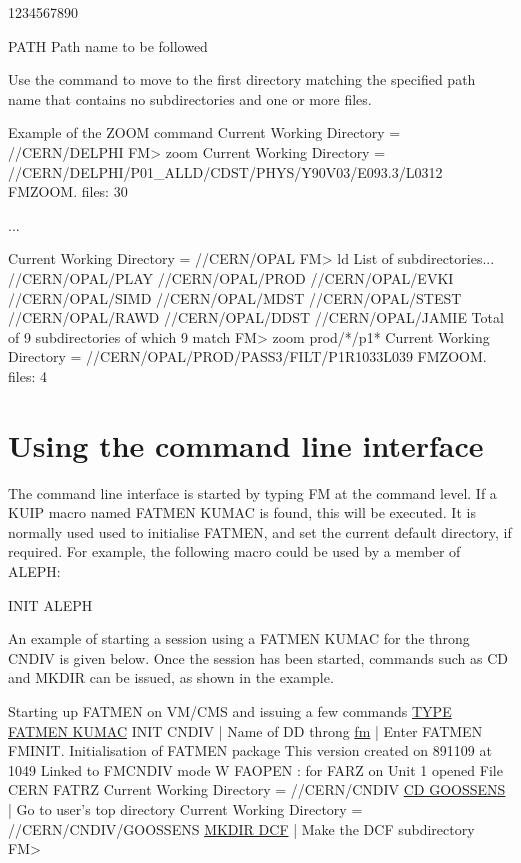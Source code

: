 \begin{DLtt}{1234567890}
\item[PATH]Path name to be followed
\end{DLtt}
Use the  command to move to the first directory matching
the specified path name that contains no subdirectories and
one or more files.
\begin{XMPt}{Example of the ZOOM command}
Current Working Directory = //CERN/DELPHI
FM> zoom
Current Working Directory = //CERN/DELPHI/P01_ALLD/CDST/PHYS/Y90V03/E093.3/L0312
FMZOOM. files:          30

...

Current Working Directory = //CERN/OPAL
FM> ld
List of subdirectories...
//CERN/OPAL/PLAY
//CERN/OPAL/PROD
//CERN/OPAL/EVKI
//CERN/OPAL/SIMD
//CERN/OPAL/MDST
//CERN/OPAL/STEST
//CERN/OPAL/RAWD
//CERN/OPAL/DDST
//CERN/OPAL/JAMIE
Total of          9 subdirectories of which          9 match
FM> zoom prod/*/p1*
Current Working Directory = //CERN/OPAL/PROD/PASS3/FILT/P1R1033L039
FMZOOM. files:           4
\end{XMPt}

\section{Using the command line interface}
\par
The command line interface is started by typing FM at the command
level.
If a KUIP macro
named FATMEN KUMAC is found, this will be executed.
It is normally used
used to initialise FATMEN, and set the current default directory,
if required.
For example, the following macro could be used by
a member of ALEPH:
\begin{XMP}
INIT ALEPH
\end{XMP}

An example of starting a session using a FATMEN KUMAC for the throng
CNDIV is given below. Once the session has been started, commands
such as CD and MKDIR can be issued, as shown in the example.

\begin{XMPt}{Starting up FATMEN on VM/CMS and issuing a few commands}
\underline{TYPE FATMEN KUMAC}
INIT CNDIV     | Name of DD throng
\underline{fm}                  | Enter FATMEN
FMINIT.  Initialisation of FATMEN package
         This version created on      891109  at        1049
Linked to FMCNDIV             mode W
FAOPEN : for FARZ on Unit    1 opened File CERN FATRZ
Current Working Directory = //CERN/CNDIV
\underline{CD GOOSSENS}         | Go to user's top directory
Current Working Directory = //CERN/CNDIV/GOOSSENS
\underline{MKDIR DCF}           | Make the DCF subdirectory
FM>
\end{XMPt}

